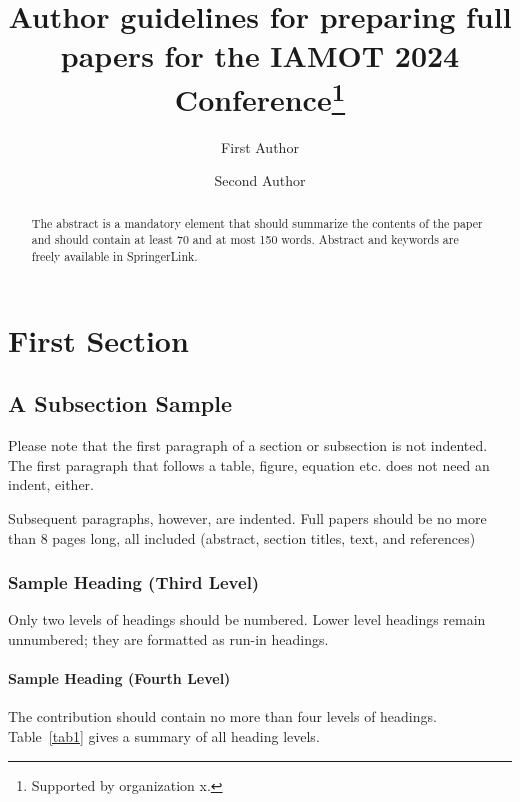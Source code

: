 \documentclass[runningheads]{llncs}
\begin{document}
%
\title{Author guidelines for preparing full papers for the IAMOT 2024 Conference\thanks{Supported by organization x.}}
%
%
\author{First Author \and
Second Author}
%
%
%
\maketitle              %
%
\begin{abstract}
The abstract is a mandatory element that should summarize the contents of the paper and should contain at least 70 and at most 150 words. Abstract and keywords are freely available in SpringerLink. 

\end{abstract}
%
%
%
\section{First Section}
\subsection{A Subsection Sample}
Please note that the first paragraph of a section or subsection is
not indented. The first paragraph that follows a table, figure,
equation etc. does not need an indent, either.

Subsequent paragraphs, however, are indented. Full papers should be no more than 8 pages long, all included (abstract, section titles, text, and references)

\subsubsection{Sample Heading (Third Level)} Only two levels of
headings should be numbered. Lower level headings remain unnumbered;
they are formatted as run-in headings.

\paragraph{Sample Heading (Fourth Level)}
The contribution should contain no more than four levels of
headings. Table~\ref{tab1} gives a summary of all heading levels.
\end{document}

